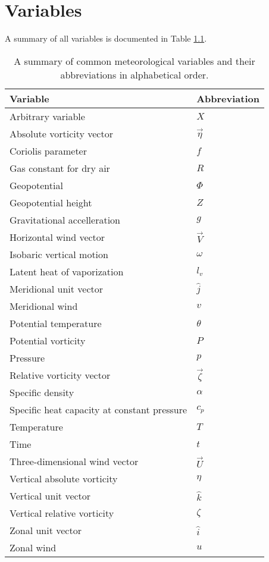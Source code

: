 \chapter{Variables}

A summary of all variables is documented in Table \ref{tab:vars}.

\begin{longtable}{| l | l |}
\caption{A summary of common meteorological variables and their abbreviations in alphabetical order.}\label{tab:vars}\\
\hline 
Variable & Abbreviation \\
\hline
Arbitrary variable & $X$ \\
Absolute vorticity vector & $\vec{\eta}$ \\
Coriolis parameter & $f$ \\
Gas constant for dry air & $R$ \\
Geopotential & $\Phi$ \\
Geopotential height & $Z$ \\
Gravitational accelleration & $g$ \\
Horizontal wind vector & $\vec{V}$ \\
Isobaric vertical motion & $\omega$ \\
Latent heat of vaporization & $l_v$ \\
Meridional unit vector & $\hat{j}$ \\
Meridional wind & $v$ \\
Potential temperature & $\theta$ \\
Potential vorticity & $P$ \\
Pressure & $p$ \\
Relative vorticity vector & $\vec{\zeta}$  \\
Specific density & $\alpha$ \\
Specific heat capacity at constant pressure & $c_p$ \\
Temperature & $T$ \\
Time & $t$ \\
Three-dimensional wind vector & $\vec{U}$ \\
Vertical absolute vorticity & $\eta$ \\
Vertical unit vector & $\hat{k}$ \\
Vertical relative vorticity & $\zeta$ \\
Zonal unit vector & $\hat{i}$ \\
Zonal wind & $u$ \\
\hline
\end{longtable}